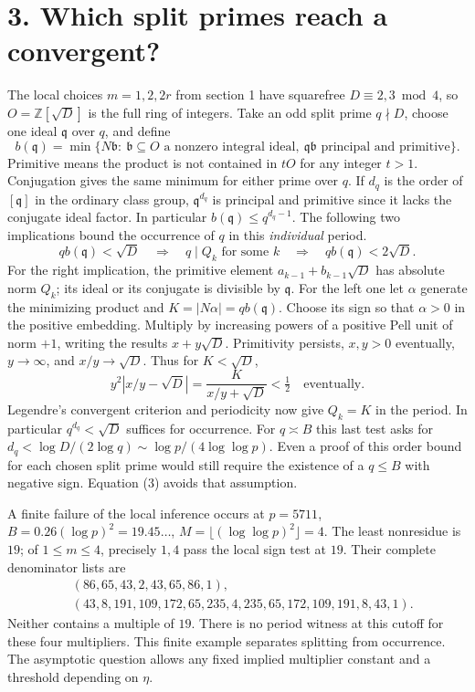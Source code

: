 \documentclass[11pt]{article}
\begin{document}
\section*{3. Which split primes reach a convergent?}
The local choices \(m=1,2,2r\) from section 1 have squarefree \(D\equiv2,3\bmod4\),
so \(O=\mathbb Z[\sqrt D]\) is the full ring of integers. Take an odd split
prime \(q\nmid D\), choose one ideal \(\mathfrak q\) over \(q\), and define
\[
 b(\mathfrak q)=\min\{N\mathfrak b:\ \mathfrak b\subseteq O
 \text{ a nonzero integral ideal},\
 \mathfrak q\mathfrak b\text{ principal and primitive}\}.
\]
Primitive means the product is not contained in \(tO\) for any integer \(t>1\).
Conjugation gives the same minimum for either prime over \(q\). If \(d_q\)
is the order of \([\mathfrak q]\) in the ordinary class group, \(\mathfrak
q^{d_q}\) is principal and primitive since it lacks the conjugate ideal
factor. In particular \(b(\mathfrak q)\le q^{d_q-1}\). The following two
implications bound the occurrence of \(q\) in this \emph{individual} period.
\begin{equation}
 qb(\mathfrak q)<\sqrt D\quad\Longrightarrow\quad
 q\mid Q_k\text{ for some }k\quad\Longrightarrow\quad
 qb(\mathfrak q)<2\sqrt D .
\end{equation}
For the right implication, the primitive element \(a_{k-1}+b_{k-1}\sqrt D\)
has absolute norm \(Q_k\); its ideal or its conjugate is divisible by
\(\mathfrak q\). For the left one let \(\alpha\) generate the minimizing
product and \(K=|N\alpha|=qb(\mathfrak q)\). Choose its sign so that
\(\alpha>0\) in the positive embedding. Multiply by increasing powers of a
positive Pell unit of norm \(+1\), writing the results \(x+y\sqrt D\).
Primitivity persists, \(x,y>0\) eventually, \(y\to\infty\),
and \(x/y\to\sqrt D\). Thus for \(K<\sqrt D\),
\[
 y^2|x/y-\sqrt D|=\frac{K}{x/y+\sqrt D}<\tfrac12
 \quad\text{eventually}.
\]
Legendre's convergent criterion and periodicity now give \(Q_k=K\)
in the period. In particular \(q^{d_q}<\sqrt D\) suffices for occurrence.
For \(q\asymp B\) this last test asks for
\(d_q<\log D/(2\log q)\sim\log p/(4\log\log p)\). Even a proof of this
order bound for each chosen split prime would still require the existence
of a \(q\le B\) with negative sign. Equation (3) avoids that assumption.

A finite failure of the local inference occurs at \(p=5711\),
\(B=0.26(\log p)^2=19.45\ldots\), \(M=\lfloor(\log\log p)^2\rfloor=4\).
The least nonresidue is \(19\); of \(1\le m\le4\), precisely \(1,4\) pass
the local sign test at \(19\). Their complete denominator lists are
\[
\begin{split}
 &(86,65,43,2,43,65,86,1),\\
 &(43,8,191,109,172,65,235,4,235,65,172,109,191,8,43,1).
\end{split}
\]
Neither contains a multiple of \(19\). There is no period witness at this
cutoff for these four multipliers. This finite example separates splitting
from occurrence. The asymptotic question allows any fixed implied multiplier
constant and a threshold depending on \(\eta\).
\end{document}
